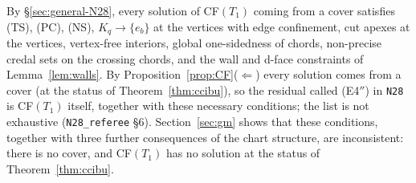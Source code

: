 \documentclass[11pt]{article}
\theoremstyle{definition}
\theoremstyle{remark}
\newcommand{\src}[1]{\texttt{#1}}
\begin{document}
By \S\ref{sec:general-N28}, every solution of CF$(T_1)$ coming from a cover satisfies (TS), (PC), (NS), $K_q\to\{e_b\}$ at the vertices with edge confinement, cut apexes at the vertices, vertex-free interiors, global one-sidedness of chords, non-precise credal sets on the crossing chords, and the wall and d-face constraints of Lemma~\ref{lem:walls}. By Proposition~\ref{prop:CF}($\Leftarrow$) every solution comes from a cover (at the status of Theorem~\ref{thm:ccibu}), so the residual called (E4$''$) in \src{N28} is CF$(T_1)$ itself, together with these necessary conditions; the list is not exhaustive (\src{N28\_referee} \S6). Section~\ref{sec:gm} shows that these conditions, together with three further consequences of the chart structure, are inconsistent: there is no cover, and CF$(T_1)$ has no solution at the status of Theorem~\ref{thm:ccibu}.
\end{document}
